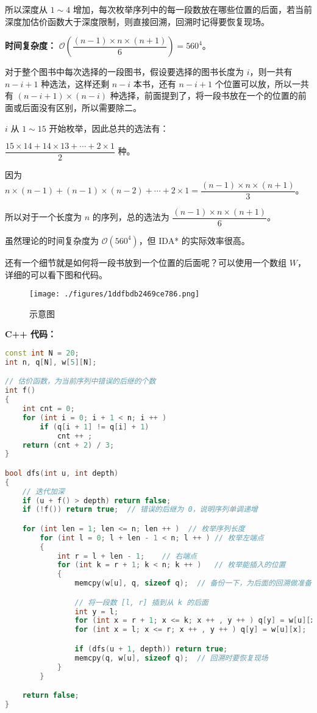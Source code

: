 所以深度从 $1 \sim 4$ 增加，每次枚举序列中的每一段数放在哪些位置的后面，若当前深度加估价函数大于深度限制，则直接回溯，回溯时记得要恢复现场。

\textbf{时间复杂度：} $\mathcal{O}(\dfrac{(n - 1) \times n \times (n + 1)}{6}) = 560^4$。

对于整个图书中每次选择的一段图书，假设要选择的图书长度为 $i$，则一共有 $n - i + 1$ 种选法，这样还剩 $n - i$ 本书，还有 $n - i + 1$ 个位置可以放，所以一共有 $(n - i + 1) \times (n - i)$ 种选择，前面提到了，将一段书放在一个的位置的前面或后面没有区别，所以需要除二。

$i$ 从 $1 \sim 15$ 开始枚举，因此总共的选法有：

$\dfrac{15 \times 14 + 14 \times 13 + \cdots + 2 \times 1}{2}$ 种。

因为 $n \times (n - 1) + (n - 1) \times (n - 2) + \cdots + 2 \times 1 = \dfrac{(n - 1) \times n \times (n + 1)}{3}$。

所以对于一个长度为 $n$ 的序列，总的选法为 $\dfrac{(n - 1) \times n \times (n + 1)}{6}$。

虽然理论的时间复杂度为 $\mathcal{O}(560^4)$，但 IDA* 的实际效率很高。

还有一个细节就是如何将一段书放到一个位置的后面呢？可以使用一个数组 $W$，详细的可以看下图和代码。

\begin{figure}[ht]
\centering
\texttt{[image: ./figures/1ddfbdb2469ce786.png]}
\caption{示意图} \label{fig_IDAs_1}
\end{figure}

\textbf{C++ 代码：}

\begin{lstlisting}[language=cpp]
const int N = 20;
int n, q[N], w[5][N];

// 估价函数，为当前序列中错误的后继的个数
int f()
{
    int cnt = 0;
    for (int i = 0; i + 1 < n; i ++ )
        if (q[i + 1] != q[i] + 1)
            cnt ++ ;
    return (cnt + 2) / 3;
}

bool dfs(int u, int depth)
{
    // 迭代加深
    if (u + f() > depth) return false;
    if (!f()) return true;  // 错误的后继为 0，说明序列单调递增

    for (int len = 1; len <= n; len ++ )  // 枚举序列长度
        for (int l = 0; l + len - 1 < n; l ++ ) // 枚举左端点
        {
            int r = l + len - 1;    // 右端点
            for (int k = r + 1; k < n; k ++ )   // 枚举能插入的位置
            {
                memcpy(w[u], q, sizeof q);  // 备份一下，为后面的回溯做准备

                // 将一段数 [l, r] 插到从 k 的后面
                int y = l;  
                for (int x = r + 1; x <= k; x ++ , y ++ ) q[y] = w[u][x];
                for (int x = l; x <= r; x ++ , y ++ ) q[y] = w[u][x];

                if (dfs(u + 1, depth)) return true;
                memcpy(q, w[u], sizeof q);  // 回溯时要恢复现场
            }
        }

    return false;
}
\end{lstlisting}

